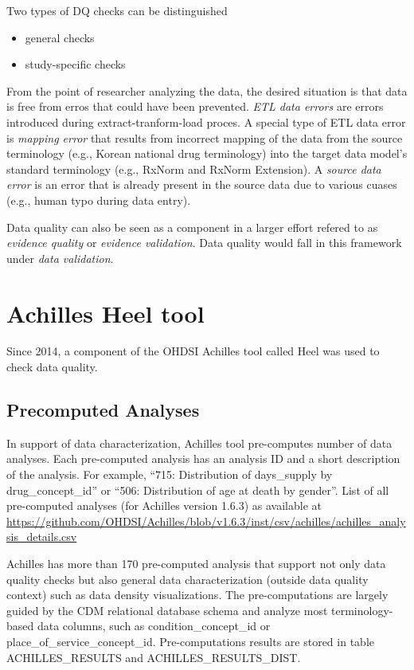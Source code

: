 \documentclass[11pt]{book}
\providecommand{\tightlist}{%
  \setlength{\itemsep}{0pt}\setlength{\parskip}{0pt}}
\begin{document}
Two types of DQ checks can be distinguished\citep{weiskopf_methods_2013}

\begin{itemize}
\tightlist
\item
  general checks
\item
  study-specific checks
\end{itemize}

From the point of researcher analyzing the data, the desired situation
is that data is free from erros that could have been prevented.
\emph{ETL data errors} are errors introduced during
extract-tranform-load proces. A special type of ETL data error is
\emph{mapping error} that results from incorrect mapping of the data
from the source terminology (e.g., Korean national drug terminology)
into the target data model's standard terminology (e.g., RxNorm and
RxNorm Extension). A \emph{source data error} is an error that is
already present in the source data due to various cuases (e.g., human
typo during data entry).

Data quality can also be seen as a component in a larger effort refered
to as \emph{evidence quality} or \emph{evidence validation}. Data
quality would fall in this framework under \emph{data validation}.

\section{Achilles Heel tool}\label{achilles-heel-tool}

Since 2014, a component of the OHDSI Achilles tool called Heel was used
to check data quality.\citep{huser_methods_2018}

\subsection{Precomputed Analyses}\label{precomputed-analyses}

In support of data characterization, Achilles tool pre-computes number
of data analyses. Each pre-computed analysis has an analysis ID and a
short description of the analysis. For example, ``715: Distribution of
days\_supply by drug\_concept\_id'' or ``506: Distribution of age at
death by gender''. List of all pre-computed analyses (for Achilles
version 1.6.3) as available at
\url{https://github.com/OHDSI/Achilles/blob/v1.6.3/inst/csv/achilles/achilles_analysis_details.csv}

Achilles has more than 170 pre-computed analysis that support not only
data quality checks but also general data characterization (outside data
quality context) such as data density visualizations. The
pre-computations are largely guided by the CDM relational database
schema and analyze most terminology-based data columns, such as
condition\_concept\_id or place\_of\_service\_concept\_id.
Pre-computations results are stored in table ACHILLES\_RESULTS and
ACHILLES\_RESULTS\_DIST.
\end{document}
